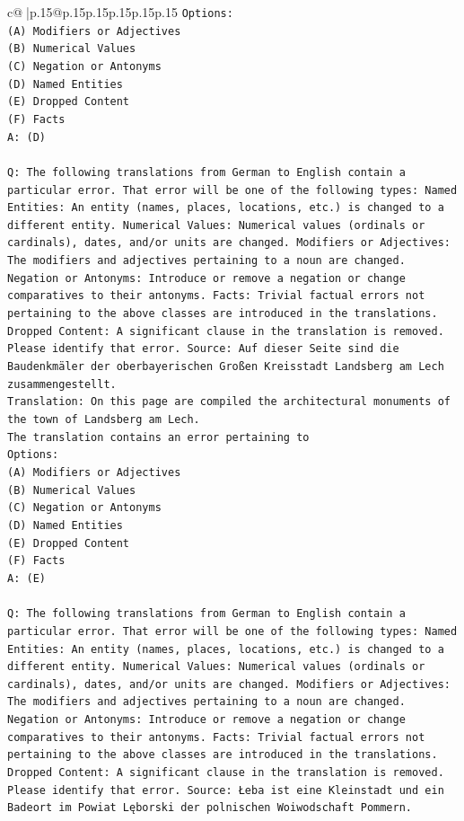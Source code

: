 \documentclass{article}
\begin{document}
{\begin{supertabular}{c@{$\;$}|p{.15\linewidth}@{}p{.15\linewidth}p{.15\linewidth}p{.15\linewidth}p{.15\linewidth}p{.15\linewidth}}
{{{\texttt{Options:} \\
\texttt{(A) Modifiers or Adjectives} \\
\texttt{(B) Numerical Values} \\
\texttt{(C) Negation or Antonyms} \\
\texttt{(D) Named Entities} \\
\texttt{(E) Dropped Content} \\
\texttt{(F) Facts} \\
\texttt{A: (D)} \\
\\ 
\texttt{Q: The following translations from German to English contain a particular error. That error will be one of the following types: Named Entities: An entity (names, places, locations, etc.) is changed to a different entity. Numerical Values: Numerical values (ordinals or cardinals), dates, and/or units are changed. Modifiers or Adjectives: The modifiers and adjectives pertaining to a noun are changed. Negation or Antonyms: Introduce or remove a negation or change comparatives to their antonyms. Facts: Trivial factual errors not pertaining to the above classes are introduced in the translations. Dropped Content: A significant clause in the translation is removed. Please identify that error.  Source: Auf dieser Seite sind die Baudenkmäler der oberbayerischen Großen Kreisstadt Landsberg am Lech zusammengestellt.} \\
\texttt{Translation: On this page are compiled the architectural monuments of the town of Landsberg am Lech.} \\
\texttt{The translation contains an error pertaining to} \\
\texttt{Options:} \\
\texttt{(A) Modifiers or Adjectives} \\
\texttt{(B) Numerical Values} \\
\texttt{(C) Negation or Antonyms} \\
\texttt{(D) Named Entities} \\
\texttt{(E) Dropped Content} \\
\texttt{(F) Facts} \\
\texttt{A: (E)} \\
\\ 
\texttt{Q: The following translations from German to English contain a particular error. That error will be one of the following types: Named Entities: An entity (names, places, locations, etc.) is changed to a different entity. Numerical Values: Numerical values (ordinals or cardinals), dates, and/or units are changed. Modifiers or Adjectives: The modifiers and adjectives pertaining to a noun are changed. Negation or Antonyms: Introduce or remove a negation or change comparatives to their antonyms. Facts: Trivial factual errors not pertaining to the above classes are introduced in the translations. Dropped Content: A significant clause in the translation is removed. Please identify that error.  Source: Łeba ist eine Kleinstadt und ein Badeort im Powiat Lęborski der polnischen Woiwodschaft Pommern.} \\
}}}
\end{supertabular}}
\end{document}
